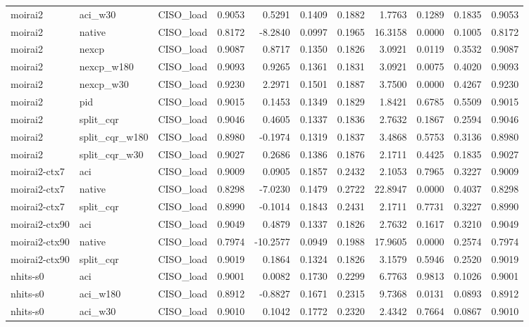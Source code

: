 \begin{tabular}{lllrrrrrrrr}
moirai2 & aci_w30 & CISO_load & 0.9053 & 0.5291 & 0.1409 & 0.1882 & 1.7763 & 0.1289 & 0.1835 & 0.9053 \\
moirai2 & native & CISO_load & 0.8172 & -8.2840 & 0.0997 & 0.1965 & 16.3158 & 0.0000 & 0.1005 & 0.8172 \\
moirai2 & nexcp & CISO_load & 0.9087 & 0.8717 & 0.1350 & 0.1826 & 3.0921 & 0.0119 & 0.3532 & 0.9087 \\
moirai2 & nexcp_w180 & CISO_load & 0.9093 & 0.9265 & 0.1361 & 0.1831 & 3.0921 & 0.0075 & 0.4020 & 0.9093 \\
moirai2 & nexcp_w30 & CISO_load & 0.9230 & 2.2971 & 0.1501 & 0.1887 & 3.7500 & 0.0000 & 0.4267 & 0.9230 \\
moirai2 & pid & CISO_load & 0.9015 & 0.1453 & 0.1349 & 0.1829 & 1.8421 & 0.6785 & 0.5509 & 0.9015 \\
moirai2 & split_cqr & CISO_load & 0.9046 & 0.4605 & 0.1337 & 0.1836 & 2.7632 & 0.1867 & 0.2594 & 0.9046 \\
moirai2 & split_cqr_w180 & CISO_load & 0.8980 & -0.1974 & 0.1319 & 0.1837 & 3.4868 & 0.5753 & 0.3136 & 0.8980 \\
moirai2 & split_cqr_w30 & CISO_load & 0.9027 & 0.2686 & 0.1386 & 0.1876 & 2.1711 & 0.4425 & 0.1835 & 0.9027 \\
moirai2-ctx7 & aci & CISO_load & 0.9009 & 0.0905 & 0.1857 & 0.2432 & 2.1053 & 0.7965 & 0.3227 & 0.9009 \\
moirai2-ctx7 & native & CISO_load & 0.8298 & -7.0230 & 0.1479 & 0.2722 & 22.8947 & 0.0000 & 0.4037 & 0.8298 \\
moirai2-ctx7 & split_cqr & CISO_load & 0.8990 & -0.1014 & 0.1843 & 0.2431 & 2.1711 & 0.7731 & 0.3227 & 0.8990 \\
moirai2-ctx90 & aci & CISO_load & 0.9049 & 0.4879 & 0.1337 & 0.1826 & 2.7632 & 0.1617 & 0.3210 & 0.9049 \\
moirai2-ctx90 & native & CISO_load & 0.7974 & -10.2577 & 0.0949 & 0.1988 & 17.9605 & 0.0000 & 0.2574 & 0.7974 \\
moirai2-ctx90 & split_cqr & CISO_load & 0.9019 & 0.1864 & 0.1324 & 0.1826 & 3.1579 & 0.5946 & 0.2520 & 0.9019 \\
nhits-s0 & aci & CISO_load & 0.9001 & 0.0082 & 0.1730 & 0.2299 & 6.7763 & 0.9813 & 0.1026 & 0.9001 \\
nhits-s0 & aci_w180 & CISO_load & 0.8912 & -0.8827 & 0.1671 & 0.2315 & 9.7368 & 0.0131 & 0.0893 & 0.8912 \\
nhits-s0 & aci_w30 & CISO_load & 0.9010 & 0.1042 & 0.1772 & 0.2320 & 2.4342 & 0.7664 & 0.0867 & 0.9010 \\

\end{tabular}
